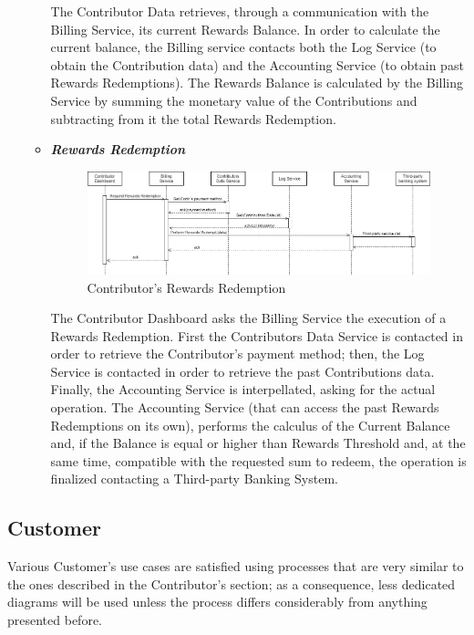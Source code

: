 \begin{itemize}
\begin{itemize}
        The Contributor Data retrieves, through a communication with the Billing Service, its current Rewards Balance. In order to calculate the current balance, the Billing service contacts both the Log Service (to obtain the Contribution data) and the Accounting Service (to obtain past Rewards Redemptions). The Rewards Balance is calculated by the Billing Service by summing the monetary value of the Contributions and subtracting from it the total Rewards Redemption. 

        \item \textbf{\textit{Rewards Redemption}}\\
        \begin{figure}[!ht]
            \centering
            \includegraphics[width=\linewidth]{document/chapters/chapter_5/images/use_cases_satisfaction_rewards_redemption.jpg}
            \caption{Contributor's Rewards Redemption}
            \label{fig:use_cases_satisfaction_rewards_redemption}
        \end{figure}

        The Contributor Dashboard asks the Billing Service the execution of a Rewards Redemption. First the Contributors Data Service is contacted in order to retrieve the Contributor's payment method; then, the Log Service is contacted in order to retrieve the past Contributions data. Finally, the Accounting Service is interpellated, asking for the actual operation. The Accounting Service (that can access the past Rewards Redemptions on its own), performs the calculus of the Current Balance and, if the Balance is equal or higher than Rewards Threshold and, at the same time, compatible with the requested sum to redeem, the operation is finalized contacting a Third-party Banking System.

    \end{itemize}
\end{itemize}

\subsection{Customer}
Various Customer's use cases are satisfied using processes that are very similar to the ones described in the Contributor's section; as a consequence, less dedicated diagrams will be used unless the process differs considerably from anything presented before.

